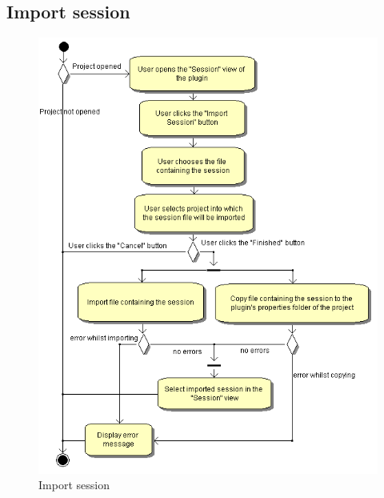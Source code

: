 \subsection{Import session}
\begin{figure}[htb]
 \centering
 \includegraphics[height=0.7\textheight]{images/Activities/import_session.png}
 \caption{Import session}
 \label{ac_fg:import}
\end{figure}

\clearpage
